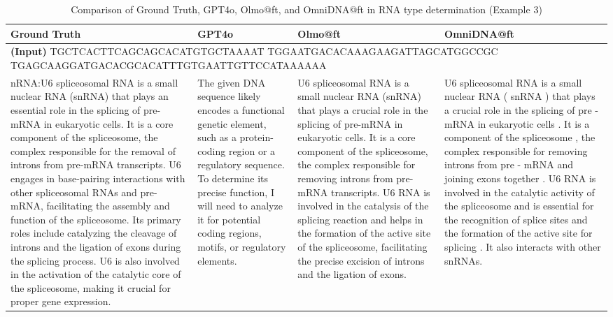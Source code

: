 \begin{table}[h]
    \centering
    \renewcommand{\arraystretch}{1.5}
    \begin{tabular}{|p{4cm}|p{4cm}|p{4cm}|p{4cm}|}
        \hline
        \textbf{Ground Truth} & \textbf{GPT4o} & \textbf{Olmo@ft} & \textbf{OmniDNA@ft} \\
        \hline
\multicolumn{4}{|p{16cm}|}{\textbf{(Input)} 
TGCTCACTTCAGCAGCACATGTGCTAAAAT
TGGAATGACACAAAGAAGATTAGCATGGCCGC
TGAGCAAGGATGACACGCACATTTGTGAATTGTTCCATAAAAAA} \\
        \hline
       nRNA:U6 spliceosomal RNA is a small nuclear RNA (snRNA) that plays an essential role in the splicing of pre-mRNA in eukaryotic cells. It is a core component of the spliceosome, the complex responsible for the removal of introns from pre-mRNA transcripts. U6 engages in base-pairing interactions with other spliceosomal RNAs and pre-mRNA, facilitating the assembly and function of the spliceosome. Its primary roles include catalyzing the cleavage of introns and the ligation of exons during the splicing process. U6 is also involved in the activation of the catalytic core of the spliceosome, making it crucial for proper gene expression. & The given DNA sequence likely encodes a functional genetic element, such as a protein-coding region or a regulatory sequence. To determine its precise function, I will need to analyze it for potential coding regions, motifs, or regulatory elements. & U6 spliceosomal RNA is a small nuclear RNA (snRNA) that plays a crucial role in the splicing of pre-mRNA in eukaryotic cells. It is a core component of the spliceosome, the complex responsible for removing introns from pre-mRNA transcripts. U6 RNA is involved in the catalysis of the splicing reaction and helps in the formation of the active site of the spliceosome, facilitating the precise excision of introns and the ligation of exons.  & U6 spliceosomal RNA is a small nuclear RNA ( snRNA ) that plays a crucial role in the splicing of pre - mRNA in eukaryotic cells . It is a component of the spliceosome , the complex responsible for removing introns from pre - mRNA and joining exons together . U6 RNA is involved in the catalytic activity of the spliceosome and is essential for the recognition of splice sites and the formation of the active site for splicing . It also interacts with other snRNAs. \\
        \hline
    \end{tabular}
    \caption{Comparison of Ground Truth, GPT4o, Olmo@ft, and OmniDNA@ft in RNA type determination (Example 3)}
    \label{tab:dna2func-3}
\end{table}